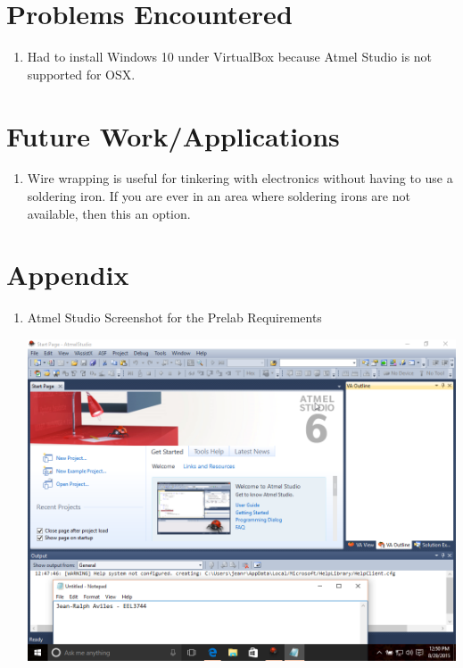\documentclass[12pt]{article}
\begin{document}
\section{Problems Encountered}
\begin{enumerate}
\item Had to install Windows 10 under VirtualBox because Atmel Studio is not supported for OSX.
\end{enumerate}
\section{Future Work/Applications}
\begin{enumerate}
\item Wire wrapping is useful for tinkering with electronics without having to use a soldering iron. If you are ever in an area where soldering irons are not available, then this an option.
\end{enumerate}

\section{Appendix}
\begin{enumerate}

\item Atmel Studio Screenshot for the Prelab Requirements
\begin{center}
\includegraphics[width=\textwidth]{atmel}
\end{center}

\end{enumerate}
\end{document}
